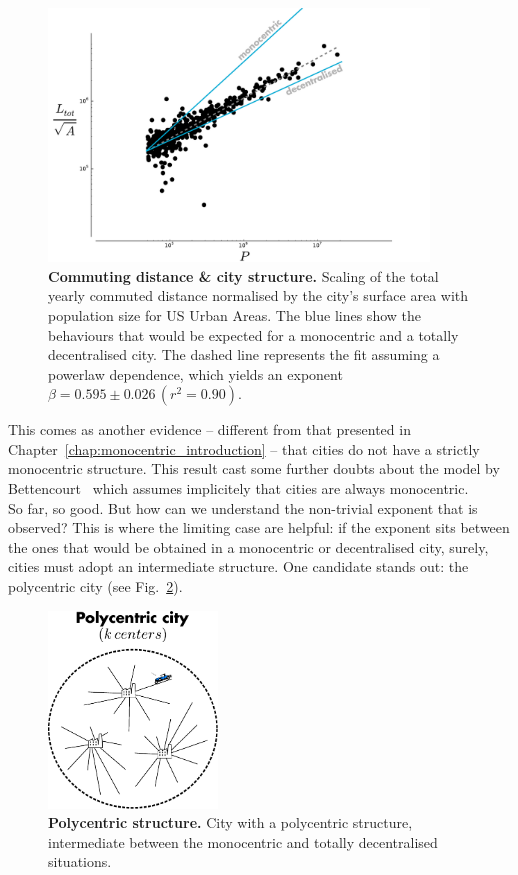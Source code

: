 \begin{figure}
    \centering
    \includegraphics[width=0.9\textwidth]{gfx/chapter-scaling/scaling_commuting_norm.pdf}
    \caption{{\bf Commuting distance \& city structure.} Scaling of the total yearly commuted distance normalised by the
    city's surface area with population size for US Urban Areas. The blue lines
show the behaviours that would be expected for a monocentric and a totally
decentralised city. The dashed line represents the fit assuming a powerlaw
dependence, which yields an exponent $\beta =  0.595 \pm 0.026\, (r^2 =
0.90)$.\label{fig:scaling_Ltot_norm}}
    
\end{figure}

This comes as another evidence -- different from that presented in
Chapter~\ref{chap:monocentric_introduction} -- that cities do not have a
strictly monocentric structure. This result cast some further doubts
about the model by Bettencourt~\cite{Bettencourt:2013} which assumes implicitely that cities are always
monocentric.\\

So far, so good. But how can we understand the non-trivial exponent that is observed? This is
where the limiting case are helpful: if the exponent sits between the ones that
would be obtained in a monocentric or decentralised city, surely, cities must
adopt an intermediate structure. One candidate stands out: the polycentric city (see
Fig.~\ref{fig:polycentric}).

\begin{figure}[!h]
    \centering
    \includegraphics[width=0.4\textwidth]{gfx/chapter-scaling/polycentric.pdf}
    \caption{{\bf Polycentric structure.} City with a polycentric structure, intermediate between the
    monocentric and totally decentralised situations. \label{fig:polycentric}}
\end{figure}

